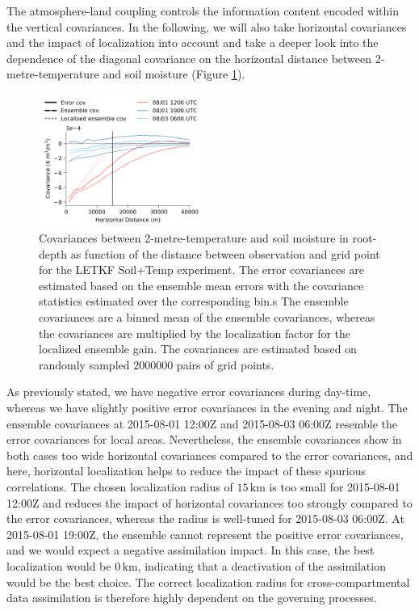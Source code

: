 \documentclass[HESSD, manuscript]{copernicus}
\begin{document}
The atmosphere-land coupling controls the information content encoded within the vertical covariances.
In the following, we will also take horizontal covariances and the impact of localization into account and take a deeper look into the dependence of the diagonal covariance on the horizontal distance between 2-metre-temperature and soil moisture (Figure \ref{fig:covariance_dist}).

\begin{figure}[ht]
	\includegraphics[width=0.48\textwidth]{figures/fig_11_covariance_dist.png}
	\caption{
		Covariances between 2-metre-temperature and soil moisture in root-depth as function of the distance between observation and grid point for the LETKF Soil+Temp experiment.
		The error covariances are estimated based on the ensemble mean errors with the covariance statistics estimated over the corresponding bin.s
		The ensemble covariances are a binned mean of the ensemble covariances, whereas the covariances are multiplied by the localization factor for the localized ensemble gain.
		The covariances are estimated based on randomly sampled $2000000$ pairs of grid points.
	}
	\label{fig:covariance_dist}
\end{figure}

As previously stated, we have negative error covariances during day-time, whereas we have slightly positive error covariances in the evening and night.
The ensemble covariances at 2015-08-01 12:00Z and 2015-08-03 06:00Z resemble the error covariances for local areas.
Nevertheless, the ensemble covariances show in both cases too wide horizontal covariances compared to the error covariances, and here, horizontal localization helps to reduce the impact of these spurious correlations.
The chosen localization radius of $15\,\text{km}$ is too small for 2015-08-01 12:00Z and reduces the impact of horizontal covariances too strongly compared to the error covariances, whereas the radius is well-tuned for 2015-08-03 06:00Z.
At 2015-08-01 19:00Z, the ensemble cannot represent the positive error covariances, and we would expect a negative assimilation impact.
In this case, the best localization would be $0\,\text{km}$, indicating that a deactivation of the assimilation would be the best choice.
The correct localization radius for cross-compartmental data assimilation is therefore highly dependent on the governing processes.
\end{document}
